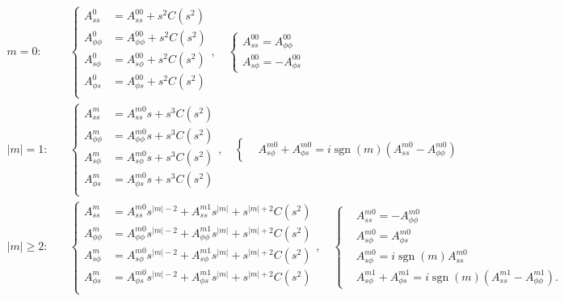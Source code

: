 \documentclass[a4paper, 11pt]{article}
\DeclareMathOperator{\sgn}{sgn}
\begin{document}
\begin{equation}
\begin{aligned}
    m = 0 :& \quad \left\{\begin{aligned}
        A_{ss}^0 &= A_{ss}^{00} + s^2 C(s^2) \\ 
        A_{\phi\phi}^0 &= A_{\phi\phi}^{00} + s^2 C(s^2) \\ 
        A_{s\phi}^0 &= A_{s\phi}^{00} + s^2 C(s^2) \\ 
        A_{\phi s}^0 &= A_{\phi s}^{00} + s^2 C(s^2) \\ 
    \end{aligned}\right.,\quad 
    \left\{\begin{aligned}
        A_{ss}^{00} = A_{\phi\phi}^{00} \\ 
        A_{s\phi}^{00} = -A_{\phi s}^{00}
    \end{aligned}\right. \\ 
    |m| = 1 :& \quad \left\{\begin{aligned}
        A_{ss}^m &= A_{ss}^{m0} s + s^3 C(s^2) \\
        A_{\phi\phi}^m &= A_{\phi\phi}^{m0} s + s^{3} C(s^2) \\
        A_{s\phi}^m &= A_{s\phi}^{m0} s + s^{3} C(s^2) \\
        A_{\phi s}^m &= A_{\phi s}^{m0} s + s^{3} C(s^2) \\
    \end{aligned}\right.,\quad \left\{\begin{aligned}
        &A_{s\phi}^{m0} + A_{\phi s}^{m0} = i\sgn(m) \left(A_{ss}^{m0} - A_{\phi\phi}^{m0}\right)
    \end{aligned}\right. \\
    |m| \geq 2 :& \quad \left\{\begin{aligned}
        A_{ss}^m &= A_{ss}^{m0} s^{|m|-2} + A_{ss}^{m1} s^{|m|} + s^{|m|+2} C(s^2) \\
        A_{\phi\phi}^m &= A_{\phi\phi}^{m0} s^{|m|-2} + A_{\phi \phi}^{m1} s^{|m|} + s^{|m|+2} C(s^2) \\
        A_{s\phi}^m &= A_{s\phi}^{m0} s^{|m|-2} + A_{s\phi}^{m1} s^{|m|} + s^{|m|+2} C(s^2) \\
        A_{\phi s}^m &= A_{\phi s}^{m0} s^{|m|-2} + A_{\phi s}^{m1} s^{|m|} + s^{|m|+2} C(s^2) \\
    \end{aligned}\right.,\quad \left\{\begin{aligned}
        &A_{ss}^{m0} = - A_{\phi\phi}^{m0}\\
        &A_{s\phi}^{m0} = A_{\phi s}^{m0} \\ 
        &A_{s\phi}^{m0} = i \sgn(m) A_{ss}^{m0} \\ 
        &A_{s\phi}^{m1} + A_{\phi s}^{m1} = i\sgn(m)\left(A_{ss}^{m1} - A_{\phi\phi}^{m1}\right).
    \end{aligned}\right.
\end{aligned}
\end{equation}
\end{document}
